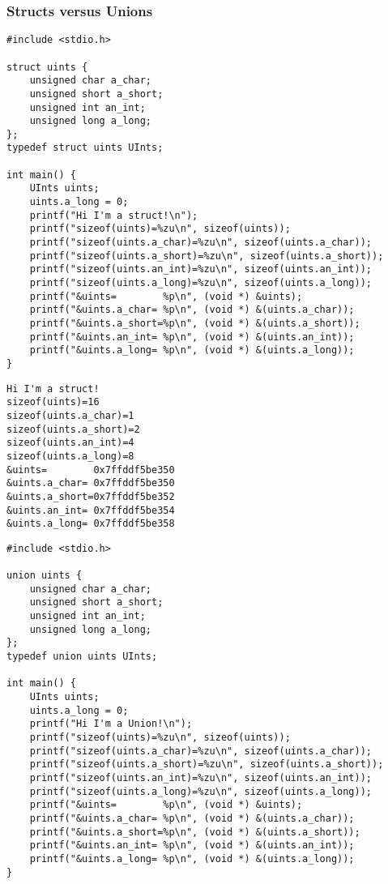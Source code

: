 \documentclass[11pt]{article}
\begin{document}
\subsubsection{Structs versus Unions}
\label{sec:orgd111913}

\begin{verbatim}
#include <stdio.h>

struct uints {
    unsigned char a_char;
    unsigned short a_short;
    unsigned int an_int;
    unsigned long a_long;
};
typedef struct uints UInts;

int main() {
    UInts uints;
    uints.a_long = 0;
    printf("Hi I'm a struct!\n");
    printf("sizeof(uints)=%zu\n", sizeof(uints));
    printf("sizeof(uints.a_char)=%zu\n", sizeof(uints.a_char));
    printf("sizeof(uints.a_short)=%zu\n", sizeof(uints.a_short));
    printf("sizeof(uints.an_int)=%zu\n", sizeof(uints.an_int));
    printf("sizeof(uints.a_long)=%zu\n", sizeof(uints.a_long));
    printf("&uints=        %p\n", (void *) &uints);
    printf("&uints.a_char= %p\n", (void *) &(uints.a_char));
    printf("&uints.a_short=%p\n", (void *) &(uints.a_short));
    printf("&uints.an_int= %p\n", (void *) &(uints.an_int));
    printf("&uints.a_long= %p\n", (void *) &(uints.a_long));
}
\end{verbatim}

\begin{verbatim}
Hi I'm a struct!
sizeof(uints)=16
sizeof(uints.a_char)=1
sizeof(uints.a_short)=2
sizeof(uints.an_int)=4
sizeof(uints.a_long)=8
&uints=        0x7ffddf5be350
&uints.a_char= 0x7ffddf5be350
&uints.a_short=0x7ffddf5be352
&uints.an_int= 0x7ffddf5be354
&uints.a_long= 0x7ffddf5be358
\end{verbatim}

\begin{verbatim}
#include <stdio.h>

union uints {
    unsigned char a_char;
    unsigned short a_short;
    unsigned int an_int;
    unsigned long a_long;
};
typedef union uints UInts;

int main() {
    UInts uints;
    uints.a_long = 0;
    printf("Hi I'm a Union!\n");
    printf("sizeof(uints)=%zu\n", sizeof(uints));
    printf("sizeof(uints.a_char)=%zu\n", sizeof(uints.a_char));
    printf("sizeof(uints.a_short)=%zu\n", sizeof(uints.a_short));
    printf("sizeof(uints.an_int)=%zu\n", sizeof(uints.an_int));
    printf("sizeof(uints.a_long)=%zu\n", sizeof(uints.a_long));
    printf("&uints=        %p\n", (void *) &uints);
    printf("&uints.a_char= %p\n", (void *) &(uints.a_char));
    printf("&uints.a_short=%p\n", (void *) &(uints.a_short));
    printf("&uints.an_int= %p\n", (void *) &(uints.an_int));
    printf("&uints.a_long= %p\n", (void *) &(uints.a_long));
}
\end{verbatim}
\end{document}
